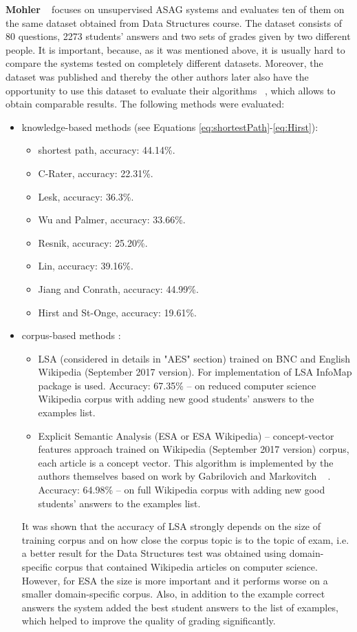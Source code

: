 \textbf{Mohler} ~\cite{Mohler} focuses on unsupervised ASAG systems and evaluates ten of them on the same dataset obtained from  Data Structures course. The dataset consists of 80 questions, 2273 students' answers and two sets of grades given by two different people. It is important, because, as it was mentioned above, it is usually hard to compare the  systems tested on completely different datasets. Moreover, the dataset was published and thereby the other authors later also have the opportunity to use this dataset to evaluate their algorithms ~\cite{Sultan}, which allows to obtain comparable results. The following methods were evaluated: 
\begin{itemize}
	\item knowledge-based methods (see Equations \ref{eq:shortestPath}-\ref{eq:Hirst}):
	\begin{itemize}
	\item shortest path, accuracy: 44.14\%.
	\item C-Rater, accuracy: 22.31\%.
	\item Lesk, accuracy: 36.3\%.
	\item Wu and Palmer, accuracy: 33.66\%.
	\item Resnik, accuracy: 25.20\%.
	\item Lin, accuracy: 39.16\%.
	\item Jiang and Conrath, accuracy: 44.99\%.
	\item Hirst and St-Onge, accuracy: 19.61\%.
	\end{itemize}
	\item corpus-based methods :
	\begin{itemize}
		\item LSA (considered in details in "AES" section) trained on BNC and English Wikipedia (September 2017 version). For implementation of LSA InfoMap 			package is used. Accuracy: 67.35\% -- on reduced computer science Wikipedia corpus with adding new good students' answers to the examples list.
		\item Explicit Semantic Analysis (ESA or ESA Wikipedia) -- concept-vector features approach trained on Wikipedia (September 2017 version) corpus, 				each article is a concept vector. This algorithm is implemented by the authors themselves based on work by Gabrilovich and Markovitch ~							\cite{Gabrilovich}. Accuracy: 64.98\% -- on full Wikipedia corpus with adding new good students' answers to the examples list.
	\end{itemize}
	It was shown that the accuracy of LSA strongly depends on the size of training corpus and on how close the corpus topic is to the topic of exam, i.e. 	a better result for the Data Structures test was obtained using domain-specific corpus that contained Wikipedia articles on computer science. 			However, for ESA the size is more important and it performs worse on a smaller domain-specific corpus. Also, in addition to the example correct 			answers the system added the best student answers to the list of examples, which helped to improve the quality of grading significantly. 
\end{itemize}

